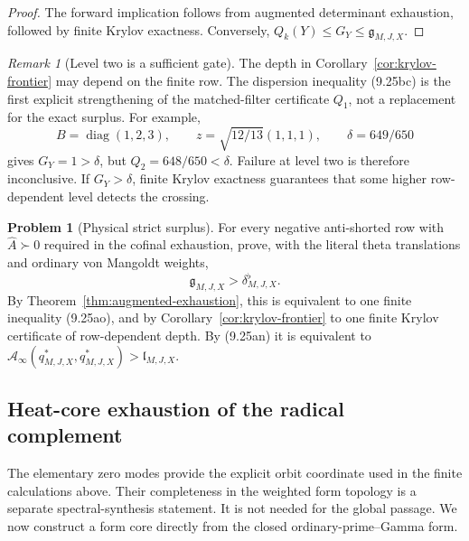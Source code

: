 \documentclass[11pt]{amsart}
\theoremstyle{definition}
\newtheorem{problem}[theorem]{Problem}
\theoremstyle{remark}
\newtheorem{remark}[theorem]{Remark}
\begin{document}
\begin{proof}
The forward implication follows from augmented determinant exhaustion,
followed by finite Krylov exactness.  Conversely,
\(Q_k(Y)\le G_Y\le\mathfrak g_{M,J,X}\).
\end{proof}

\begin{remark}[Level two is a sufficient gate]
The depth in Corollary~\ref{cor:krylov-frontier} may depend on the finite
row.  The dispersion inequality (9.25bc) is the first explicit
strengthening of the matched-filter certificate \(Q_1\), not a replacement for the exact surplus.  For
example,
\[
 B=\operatorname{diag}(1,2,3),\qquad
 z=\sqrt{12/13}(1,1,1),\qquad
 \delta=649/650
\]
gives \(G_Y=1>\delta\), but \(Q_2=648/650<\delta\).  Failure at level
two is therefore inconclusive.  If \(G_Y>\delta\), finite Krylov
exactness guarantees that some higher row-dependent level detects the
crossing.
\end{remark}

\begin{problem}[Physical strict surplus]
\label{prob:physical-strict-surplus}
For every negative anti-shorted row with \(\widehat A\succ0\) required in the cofinal exhaustion,
prove, with the literal theta translations and ordinary von Mangoldt
weights,
\[
 \boxed{\mathfrak g_{M,J,X}>\delta^{\flat}_{M,J,X}.}
\tag{9.25bi}
\]
By Theorem~\ref{thm:augmented-exhaustion}, this is equivalent to one
finite inequality (9.25ao), and by
Corollary~\ref{cor:krylov-frontier} to one finite Krylov certificate of
row-dependent depth.  By (9.25an) it is equivalent to
\(\mathcal A_\infty(q^*_{M,J,X},q^*_{M,J,X})>\mathfrak l_{M,J,X}\).
\end{problem}

\subsection{Heat-core exhaustion of the radical complement}
\label{subsec:heat-core}

The elementary zero modes provide the explicit orbit coordinate used in
the finite calculations above.  Their completeness in the weighted form
topology is a separate spectral-synthesis statement.  It is not needed for
the global passage.  We now construct a form core directly from the closed
ordinary-prime--Gamma form.
\end{document}
